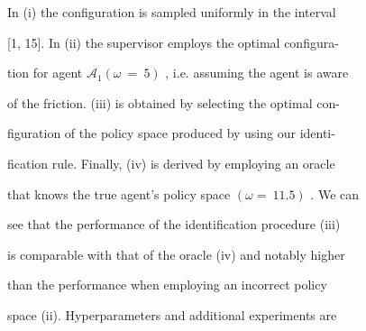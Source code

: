 \documentclass[a4paper,12pt]{article}
\begin{document}
In (i) the configuration is sampled uniformly in the interval

[1, 15]. In (ii) the supervisor employs the optimal configura-

tion for agent $\mathcal{A}_{1} (\omega\ =\ 5)$ , i.e. assuming the agent is aware

of the friction. (iii) is obtained by selecting the optimal con-

figuration of the policy space produced by using our identi-

fication rule. Finally, (iv) is derived by employing an oracle

that knows the true agent's policy space $(\omega=\ 11.5)$ . We can

see that the performance of the identification procedure (iii)

is comparable with that of the oracle (iv) and notably higher

than the performance when employing an incorrect policy

space (ii). Hyperparameters and additional experiments are
\end{document}
